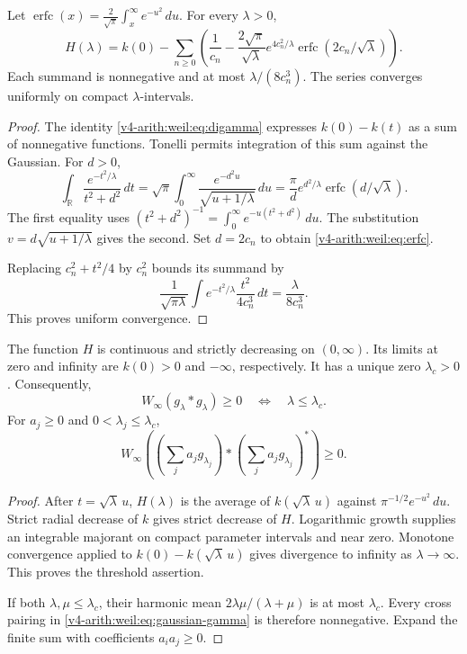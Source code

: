 \begin{theorem}
\label{v4-arith:weil:thm:erfc}
Let
\(\operatorname{erfc}(x)=\frac2{\sqrt\pi}\int_x^\infty e^{-u^2}\,du\).
For every \(\lambda>0\),
\begin{equation}
 H(\lambda)=k(0)-\sum_{n\ge0}
 \left(\frac1{c_n}
       -\frac{2\sqrt\pi}{\sqrt\lambda}
        e^{4c_n^2/\lambda}\operatorname{erfc}(2c_n/\sqrt\lambda)\right).
 \label{v4-arith:weil:eq:erfc}
\end{equation}
Each summand is nonnegative and at most \(\lambda/(8c_n^3)\).
The series converges uniformly on compact \(\lambda\)-intervals.
\end{theorem}
\begin{proof}
The identity \eqref{v4-arith:weil:eq:digamma} expresses
\(k(0)-k(t)\) as a sum of nonnegative functions.
Tonelli permits integration of this sum against the Gaussian.
For \(d>0\),
\[
 \int_{\mathbb R}\frac{e^{-t^2/\lambda}}{t^2+d^2}\,dt
 =\sqrt\pi\int_0^\infty
            \frac{e^{-d^2u}}{\sqrt{u+1/\lambda}}\,du
 =\frac\pi d e^{d^2/\lambda}\operatorname{erfc}(d/\sqrt\lambda).
\]
The first equality uses
\((t^2+d^2)^{-1}=\int_0^\infty e^{-u(t^2+d^2)}\,du\).
The substitution \(v=d\sqrt{u+1/\lambda}\) gives the second.
Set \(d=2c_n\) to obtain \eqref{v4-arith:weil:eq:erfc}.

Replacing \(c_n^2+t^2/4\) by \(c_n^2\) bounds its summand by
\[
 \frac1{\sqrt{\pi\lambda}}
       \int e^{-t^2/\lambda}\frac{t^2}{4c_n^3}\,dt
             =\frac{\lambda}{8c_n^3}.
\]
This proves uniform convergence.
\end{proof}

\begin{proposition}
\label{v4-arith:weil:prop:gaussian-threshold}
The function \(H\) is continuous and strictly decreasing on
\((0,\infty)\). Its limits at zero and infinity are \(k(0)>0\)
and \(-\infty\), respectively. It has a unique zero \(\lambda_c>0\).
Consequently,
\[
 W_\infty(g_\lambda*g_\lambda)\ge0
                    \quad\Longleftrightarrow\quad\lambda\le\lambda_c.
\]
For \(a_j\ge0\) and \(0<\lambda_j\le\lambda_c\),
\[
 W_\infty\left(
       \left(\sum_j a_jg_{\lambda_j}\right)*
       \left(\sum_j a_jg_{\lambda_j}\right)^*\right)\ge0.
\]
\end{proposition}
\begin{proof}
After \(t=\sqrt\lambda\,u\), \(H(\lambda)\) is the average of
\(k(\sqrt\lambda\,u)\) against \(\pi^{-1/2}e^{-u^2}\,du\).
Strict radial decrease of \(k\) gives strict decrease of \(H\).
Logarithmic growth supplies an integrable majorant on compact
parameter intervals and near zero.
Monotone convergence applied to
\(k(0)-k(\sqrt\lambda\,u)\) gives divergence to infinity as
\(\lambda\to\infty\). This proves the threshold assertion.

If both \(\lambda,\mu\le\lambda_c\), their harmonic mean
\(2\lambda\mu/(\lambda+\mu)\) is at most \(\lambda_c\).
Every cross pairing in \eqref{v4-arith:weil:eq:gaussian-gamma}
is therefore nonnegative. Expand the finite sum with
coefficients \(a_i a_j\ge0\).

\end{proof}


